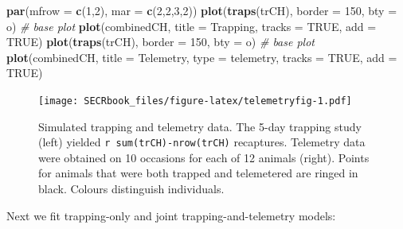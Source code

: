 \documentclass[
]{book}
\newenvironment{Shaded}{\begin{snugshade}}{\end{snugshade}}
\newcommand{\AttributeTok}[1]{\textcolor[rgb]{0.13,0.29,0.53}{#1}}
\newcommand{\CommentTok}[1]{\textcolor[rgb]{0.56,0.35,0.01}{\textit{#1}}}
\newcommand{\ConstantTok}[1]{\textcolor[rgb]{0.56,0.35,0.01}{#1}}
\newcommand{\DecValTok}[1]{\textcolor[rgb]{0.00,0.00,0.81}{#1}}
\newcommand{\FunctionTok}[1]{\textcolor[rgb]{0.13,0.29,0.53}{\textbf{#1}}}
\newcommand{\NormalTok}[1]{#1}
\newcommand{\StringTok}[1]{\textcolor[rgb]{0.31,0.60,0.02}{#1}}
\begin{document}
\begin{Shaded}
\begin{Highlighting}[]
\FunctionTok{par}\NormalTok{(}\AttributeTok{mfrow =} \FunctionTok{c}\NormalTok{(}\DecValTok{1}\NormalTok{,}\DecValTok{2}\NormalTok{), }\AttributeTok{mar =} \FunctionTok{c}\NormalTok{(}\DecValTok{2}\NormalTok{,}\DecValTok{2}\NormalTok{,}\DecValTok{3}\NormalTok{,}\DecValTok{2}\NormalTok{))}
\FunctionTok{plot}\NormalTok{(}\FunctionTok{traps}\NormalTok{(trCH), }\AttributeTok{border =} \DecValTok{150}\NormalTok{, }\AttributeTok{bty =} \StringTok{\textquotesingle{}o\textquotesingle{}}\NormalTok{) }\CommentTok{\# base plot}
\FunctionTok{plot}\NormalTok{(combinedCH, }\AttributeTok{title =} \StringTok{\textquotesingle{}Trapping\textquotesingle{}}\NormalTok{, }\AttributeTok{tracks =} \ConstantTok{TRUE}\NormalTok{, }\AttributeTok{add =} \ConstantTok{TRUE}\NormalTok{)}
\FunctionTok{plot}\NormalTok{(}\FunctionTok{traps}\NormalTok{(trCH), }\AttributeTok{border =} \DecValTok{150}\NormalTok{, }\AttributeTok{bty =} \StringTok{\textquotesingle{}o\textquotesingle{}}\NormalTok{) }\CommentTok{\# base plot}
\FunctionTok{plot}\NormalTok{(combinedCH, }\AttributeTok{title =} \StringTok{\textquotesingle{}Telemetry\textquotesingle{}}\NormalTok{, }\AttributeTok{type =} \StringTok{\textquotesingle{}telemetry\textquotesingle{}}\NormalTok{, }
     \AttributeTok{tracks =} \ConstantTok{TRUE}\NormalTok{, }\AttributeTok{add =} \ConstantTok{TRUE}\NormalTok{)}
\end{Highlighting}
\end{Shaded}

\begin{figure}
\centering
\texttt{[image: SECRbook\_files/figure-latex/telemetryfig-1.pdf]}
\caption{\label{fig:telemetryfig}Simulated trapping and telemetry data. The 5-day trapping study (left) yielded \texttt{r\ sum(trCH)-nrow(trCH)} recaptures. Telemetry data were obtained on 10 occasions for each of 12 animals (right). Points for animals that were both trapped and telemetered are ringed in black. Colours distinguish individuals.}
\end{figure}

Next we fit trapping-only and joint trapping-and-telemetry models:
\end{document}

